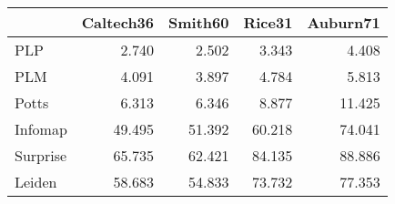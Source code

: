 \begin{tabular}{lrrrr}
\toprule
{} & Caltech36 & Smith60 & Rice31 & Auburn71 \\
\midrule
PLP      &     2.740 &   2.502 &  3.343 &    4.408 \\
PLM      &     4.091 &   3.897 &  4.784 &    5.813 \\
Potts    &     6.313 &   6.346 &  8.877 &   11.425 \\
Infomap  &    49.495 &  51.392 & 60.218 &   74.041 \\
Surprise &    65.735 &  62.421 & 84.135 &   88.886 \\
Leiden   &    58.683 &  54.833 & 73.732 &   77.353 \\
\bottomrule
\end{tabular}
